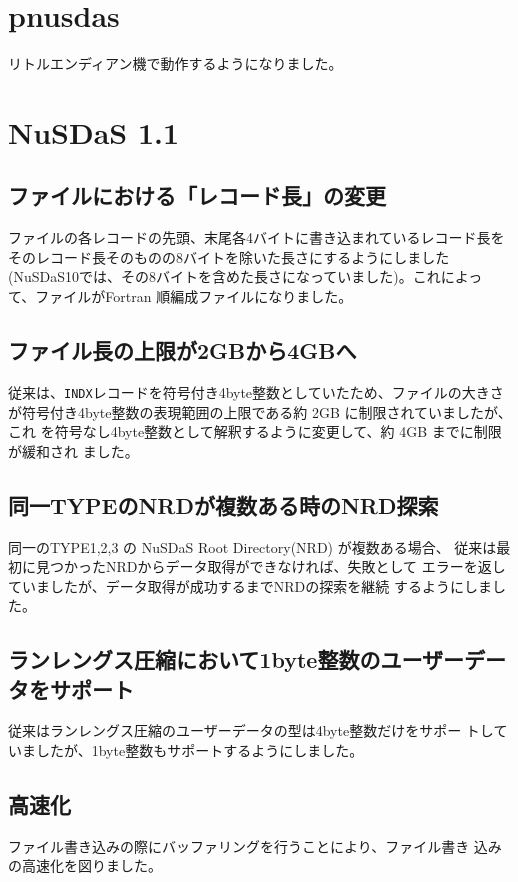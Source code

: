 
\section{pnusdas}

リトルエンディアン機で動作するようになりました。

\section{NuSDaS 1.1}
\subsection{ファイルにおける「レコード長」の変更}
ファイルの各レコードの先頭、末尾各4バイトに書き込まれているレコード長を
そのレコード長そのものの8バイトを除いた長さにするようにしました
(NuSDaS10では、その8バイトを含めた長さになっていました)。これによっ
て、ファイルがFortran 順編成ファイルになりました。
\subsection{ファイル長の上限が2GBから4GBへ}
従来は、{\tt INDX}レコードを符号付き4byte整数としていたため、ファイルの大きさ
が符号付き4byte整数の表現範囲の上限である約 2GB に制限されていましたが、これ
を符号なし4byte整数として解釈するように変更して、約 4GB までに制限が緩和され
ました。

\subsection{同一TYPEのNRDが複数ある時のNRD探索}
同一のTYPE1,2,3 の NuSDaS Root Directory(NRD) が複数ある場合、
従来は最初に見つかったNRDからデータ取得ができなければ、失敗として
エラーを返していましたが、データ取得が成功するまでNRDの探索を継続
するようにしました。
\subsection{ランレングス圧縮において1byte整数のユーザーデータをサポート}
従来はランレングス圧縮のユーザーデータの型は4byte整数だけをサポー
トしていましたが、1byte整数もサポートするようにしました。
\subsection{高速化}
ファイル書き込みの際にバッファリングを行うことにより、ファイル書き
込みの高速化を図りました。

